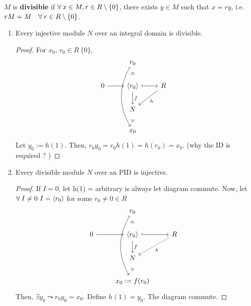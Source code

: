 \begin{definition}
  $M$ is {\bf divisible} if $\forall x\in M, r \in R \setminus \set{0}$, there exists
  $y \in M$ such that $x = ry$, i.e. $rM = M \quad \forall r \in R \setminus \set{0}$.
\end{definition}

\begin{prop} \mbox{}
  \begin{enumerate}
    \item Every injective module $N$ over an integral domain is divisible.
      \begin{proof}
        For $x_0$, $r_0 \in R \ \{0\}$,
        $$
        \begin{tikzcd}[contains/.style = {draw=none, 
        "\in" description ,sloped}]
                    & r_0 \ar[d, contains] \ar[ddd, mapsto, bend right] \\
          0 \ar[r]  & \gen{r_0} \ar[r, hook] \ar[d, "f"] & R \ar[ld, "h"] \\
                  & N \\
                  & x_0 \ar[u, contains]
        \end{tikzcd}
        $$
        Let $y_0 := h(1)$. Then, $r_0y_0 = r_0h(1) = h(r_0) = x_0$.
        (why the ID is required ? )
      \end{proof}
    \item Every divisible module $N$ over an PID is injective.
      \begin{proof}
        If $I = 0$, let h(1) = arbitrary is always let diagram commute.
        Now, let $\forall I \neq 0\ I = \gen{r_0}$ for some $r_0 \neq 0
        \in R$
        $$
        \begin{tikzcd}[contains/.style = {draw=none, 
        "\in" description ,sloped}]
                    & r_0 \ar[d, contains] \ar[ddd, mapsto, bend right] \\
          0 \ar[r]  & \gen{r_0} \ar[r, hook] \ar[d, "f"] & R \ar[ld, "h",dashed] \\
                  & N \\
                  & x_0 := f(r_0) \ar[u, contains]
        \end{tikzcd}
        $$
        Then, $\exists y_0 \leadsto r_0y_0 = x_0$. Define $h(1) = y_0$.
        The diagram commute.
     \end{proof}
  \end{enumerate}
\end{prop}

